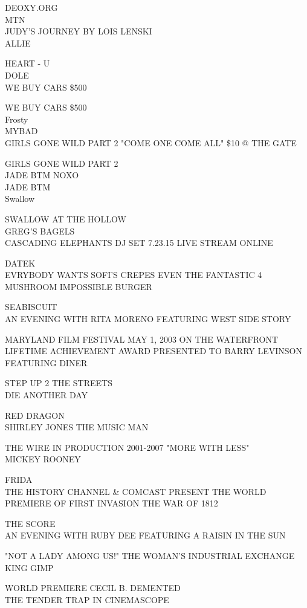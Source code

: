 \documentclass[10pt,letterpaper]{article}
\begin{document}
DEOXY.ORG\\
MTN\\
JUDY'S JOURNEY BY LOIS LENSKI\\
ALLIE

HEART {-} U\\
DOLE\\
WE BUY CARS \$500

WE BUY CARS \$500\\
Frosty\\
MYBAD\\
GIRLS GONE WILD PART 2 "COME ONE COME ALL" \$10 @ THE GATE

GIRLS GONE WILD PART 2\\
JADE BTM NOXO\\
JADE BTM\\
Swallow

SWALLOW AT THE HOLLOW\\
GREG'S BAGELS\\
CASCADING ELEPHANTS DJ SET 7.23.15 LIVE STREAM ONLINE

DATEK\\
EVRYBODY WANTS SOFI'S CREPES EVEN THE FANTASTIC 4\\
MUSHROOM IMPOSSIBLE BURGER

SEABISCUIT\\
AN EVENING WITH RITA MORENO FEATURING WEST SIDE STORY

MARYLAND FILM FESTIVAL MAY 1, 2003 ON THE WATERFRONT\\
LIFETIME ACHIEVEMENT AWARD PRESENTED TO BARRY LEVINSON FEATURING DINER

STEP UP 2 THE STREETS\\
DIE ANOTHER DAY

RED DRAGON\\
SHIRLEY JONES THE MUSIC MAN

THE WIRE IN PRODUCTION 2001{-}2007 "MORE WITH LESS"\\
MICKEY ROONEY

FRIDA\\
THE HISTORY CHANNEL \& COMCAST PRESENT THE WORLD PREMIERE OF FIRST INVASION THE WAR OF 1812

THE SCORE\\
AN EVENING WITH RUBY DEE FEATURING A RAISIN IN THE SUN

"NOT A LADY AMONG US!" THE WOMAN'S INDUSTRIAL EXCHANGE\\
KING GIMP

WORLD PREMIERE CECIL B. DEMENTED\\
THE TENDER TRAP IN CINEMASCOPE
\end{document}
